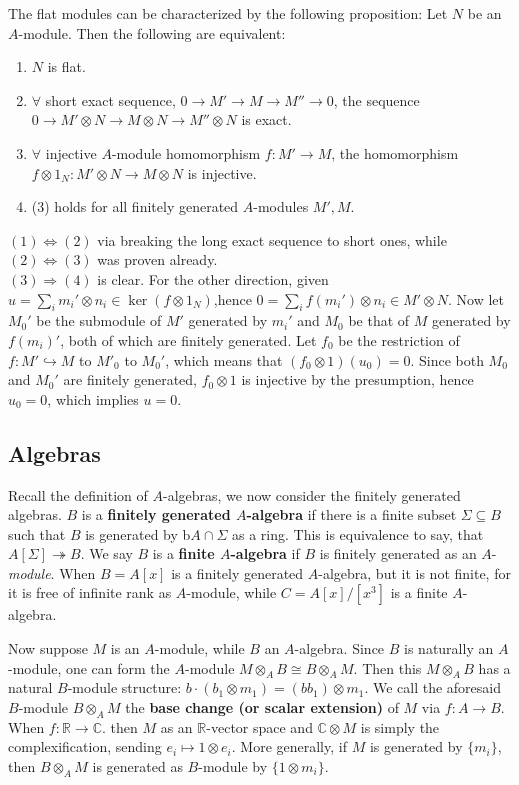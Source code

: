 \documentclass[12pt]{article}
\theoremstyle{definition}
\theoremstyle{plain}
\newcommand{\real}{\mathbb{R}}
\newcommand{\complex}{\mathbb{C}}
\newcommand{\inj}{\hookrightarrow}
\newcommand{\surj}{\twoheadrightarrow}
\begin{document}
\medskip
The flat modules can be characterized by the following proposition:
\Prop Let $N$ be an $A$-module. Then the following are equivalent:
\begin{enumerate}
  \item $N$ is flat.
  \item $\forall$ short exact sequence, $0\to M'\to M\to M''\to 0$, the sequence $0\to M'\otimes N\to M\otimes N\to M''\otimes N$ is exact.
  \item $\forall$ injective $A$-module homomorphism $f:M'\to M$, the homomorphism $f\otimes 1_N:M '\otimes N\to M\otimes N$ is injective.
  \item (3) holds for all finitely generated $A$-modules $M', M$.
\end{enumerate}
\proof $(1)\iff (2)$ via breaking the long exact sequence to short ones, while $(2)\iff (3)$ was proven already.\\
$(3)\Rightarrow (4)$ is clear. For the other direction, given $u=\sum_i m_i'\otimes n_i\in \ker(f\otimes 1_N)$,hence $0=\sum_i f(m_i')\otimes n_i\in M'\otimes N$. Now let $M_0'$ be the submodule of $M'$ generated by $m_i'$ and $M_0$ be that of $M$ generated by $f(m_i)'$, both of which are finitely generated. Let $f_0$ be the restriction of $f: M'\inj M$ to $M'_0$ to $M_0'$, which means that $(f_0\otimes 1)(u_0)=0$. Since both $M_0$ and $M_0'$ are finitely generated, $f_0\otimes 1$ is injective by the presumption, hence $u_0=0$, which implies $u=0$.
\bigskip
\subsection{Algebras}
Recall the definition of $A$-algebras, we now consider the finitely generated algebras.
\Def $B$ is a \textbf{finitely generated $A$-algebra} if there is a finite subset $\Sigma\subseteq B$ such that $B$ is generated by b$A\cap \Sigma$ as a ring. This is equivalence to say, that $A[\Sigma]\surj B$. We say $B$ is a \textbf{finite $A$-algebra} if $B$ is finitely generated as an $A$-\textit{module}.
\Exe When $B=A[x]$ is a finitely generated $A$-algebra, but it is not finite, for it is free of infinite rank as $A$-module, while $C=A[x]/[x^3]$ is a finite $A$-algebra.

\medskip
Now suppose $M$ is an $A$-module, while $B$ an $A$-algebra. Since $B$ is naturally an $A$-module, one can form the $A$-module $M\otimes_A B\cong B\otimes_A M$. Then this $M\otimes_A B$ has a natural $B$-module structure: $b\cdot(b_1\otimes m_1)=(bb_1)\otimes m_1$.
\Def We call the aforesaid $B$-module $B\otimes_A M$ the \textbf{base change (or scalar extension)} of $M$ via $f:A\to B$.
\Exe When $f:\real\to \complex$. then $M$ as an $\real$-vector space and $\complex\otimes M$ is simply the complexification, sending $e_i\mapsto 1\otimes e_i$. More generally, if $M$ is generated by $\{m_i\}$, then $B\otimes_A M$ is generated as $B$-module by $\{1\otimes m_i\}$.
\end{document}
